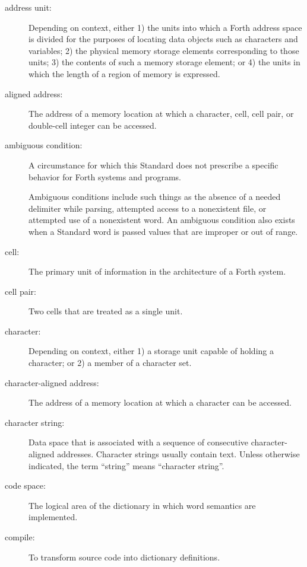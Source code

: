 \begin{description}
\item[address unit:]
Depending on context, either
1) the units into which a Forth address space is divided for the
	purposes of locating data objects such as characters and variables;
2) the physical memory storage elements corresponding to those units;
3) the contents of such a memory storage element; or
4) the units in which the length of a region of memory is expressed.

\item[aligned address:]
The address of a memory location at which a character, cell, cell
pair, or double-cell integer can be accessed.

\item[ambiguous condition:]
A circumstance for which this Standard does not prescribe a specific
behavior for Forth systems and programs.

Ambiguous conditions include such things as the absence of a needed
delimiter while parsing, attempted access to a nonexistent file, or
attempted use of a nonexistent word. An ambiguous condition also
exists when a Standard word is passed values that are improper or
out of range.

\item[cell:]
The primary unit of information in the architecture of a Forth system.

\item[cell pair:]
Two cells that are treated as a single unit.

\item[character:]
Depending on context, either
1) a storage unit capable of holding a character; or
2) a member of a character set.

\item[character-aligned address:]
The address of a memory location at which a character can be accessed.

\item[character string:]
Data space that is associated with a sequence of consecutive
character-aligned addresses. Character strings usually contain
text. Unless otherwise indicated, the term ``string'' means
``character string''.

\item[code space:]
The logical area of the dictionary in which word semantics are
implemented.

\item[compile:]
To transform source code into dictionary definitions.


\end{description}
